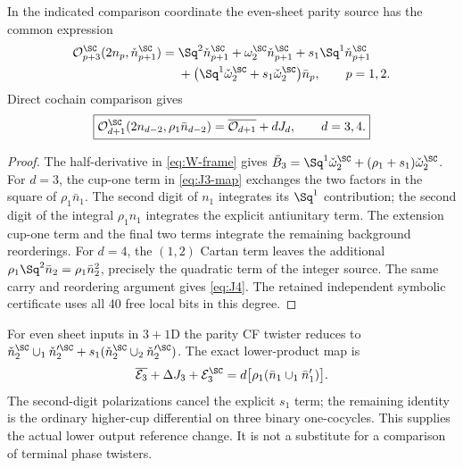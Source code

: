 In the indicated comparison coordinate the even-sheet parity source has the common expression
\begin{equation}\label{eq:even-parity-source}
 \begin{aligned}
 \mathcal O_{p+3}^{\SC}(2n_p,\check n_{p+1}^{\SC})
 ={}&\Sq^2\check n_{p+1}^{\SC}
 +\omega_2^{\SC}\check n_{p+1}^{\SC}
 +s_1\Sq^1\check n_{p+1}^{\SC}\\
 &+\big(\Sq^1\check\omega_2^{\SC}
       +s_1\check\omega_2^{\SC}\big)\bar n_p,
 \qquad p=1,2.
 \end{aligned}
\end{equation}
Direct cochain comparison gives
\begin{equation}\label{eq:lower-source-map}
 \boxed{\mathcal O_{d+1}^{\SC}
       (2n_{d-2},\rho_1\bar n_{d-2})
       =\overline{\mathcal O_{d+1}}+dJ_d,
       \qquad d=3,4.}
\end{equation}
\begin{proof}
The half-derivative in \eqref{eq:W-frame} gives
$\bar B_3=\Sq^1\check\omega_2^{\SC}
 +(\rho_1+s_1)\check\omega_2^{\SC}$.
For $d=3$, the cup-one term in \eqref{eq:J3-map} exchanges the two factors in the square of $\rho_1\bar n_1$. The second digit of $n_1$ integrates its $\Sq^1$ contribution; the second digit of the integral $\rho_1n_1$ integrates the explicit antiunitary term. The extension cup-one term and the final two terms integrate the remaining background reorderings.
For $d=4$, the $(1,2)$ Cartan term leaves the additional
$\rho_1\Sq^2\bar n_2=\rho_1\bar n_2^2$, precisely the quadratic term of the integer source. The same carry and reordering argument gives \eqref{eq:J4}. The retained independent symbolic certificate uses all 40 free local bits in this degree.
\end{proof}

For even sheet inputs in $3+1$D the parity CF twister reduces to
$\check n_2^{\SC}\cup_1\check n_2^{\prime\SC}
+s_1(\check n_2^{\SC}\cup_2\check n_2^{\prime\SC})$.
The exact lower-product map is
\begin{equation}\label{eq:parity-product-map}
 \overline{\mathcal E_3}+\Delta J_3+\mathcal E_3^{\SC}
 =d\big[\rho_1(\bar n_1\cup_1\bar n'_1)\big].
\end{equation}
The second-digit polarizations cancel the explicit $s_1$ term; the remaining identity is the ordinary higher-cup differential on three binary one-cocycles. This supplies the actual lower output reference change. It is not a substitute for a comparison of terminal phase twisters.

